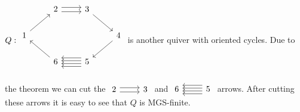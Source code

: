 \begin{example}
$Q:\begin{tikzcd}
 &       2\rightdoublearrow                                      &  3\arrow[rd]&\\
1\arrow[ru]                 &    &  &4\arrow[dl]\\
 &     6\arrow[ul]                                       & 5\leftquadruplearrow                 &\\
\end{tikzcd}$ is another quiver with oriented cycles.  Due to the theorem we can cut the $\begin{tikzcd}2\rightdoublearrow & 3\end{tikzcd}$ and  $\begin{tikzcd}6 & 5\leftquadruplearrow\end{tikzcd}$ arrows. After cutting these arrows it is easy to see that $Q$ is MGS-finite.
\end{example}